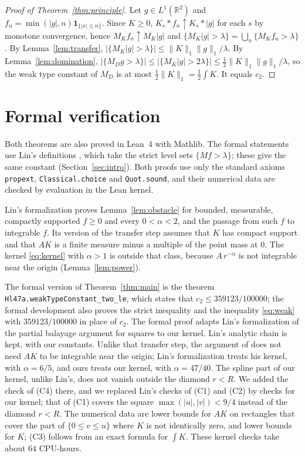 \documentclass[11pt]{amsart}
\theoremstyle{definition}
\theoremstyle{remark}
\numberwithin{equation}{section}
\newcommand{\R}{\mathbb{R}}
\newcommand{\ALPHA}{47/40}
\newcommand{\SUPPU}{9/4}
\newcommand{\LEANUPTHM}{Hl47a.\allowbreak weakType\allowbreak Constant\_\allowbreak two\_\allowbreak le}
\begin{document}
\begin{proof}[Proof of Theorem~\ref{thm:principle}]
Let $g\in L^1(\R^2)$ and $f_n=\min(|g|,n)\mathbf 1_{\{|x|\le n\}}$. Since $K\ge0$, $K_s*f_n\uparrow K_s*|g|$ for each $s$ by monotone convergence, hence $M_Kf_n\uparrow M_K|g|$ and $\{M_K|g|>\lambda\}=\bigcup_n\{M_Kf_n>\lambda\}$. By Lemma~\ref{lem:transfer}, $|\{M_K|g|>\lambda\}|\le\|K\|_1\|g\|_1/\lambda$. By Lemma~\ref{lem:domination}, $|\{M_Dg>\lambda\}|\le|\{M_K|g|>2\lambda\}|\le\frac12\|K\|_1\|g\|_1/\lambda$, so the weak type constant of $M_D$ is at most $\frac12\|K\|_1=\frac12\int K$. It equals $c_2$.
\end{proof}

\section{Formal verification}\label{app:lean}

Both theorems are also proved in Lean~4 with Mathlib. The formal statements use Lin's definitions \cite{Lin26b}, which take the strict level sets $\{Mf>\lambda\}$; these give the same constant (Section~\ref{sec:intro}). Both proofs use only the standard axioms \texttt{propext}, \texttt{Classical.choice} and \texttt{Quot.sound}, and their numerical data are checked by evaluation in the Lean kernel.

Lin's formalization \cite{Lin26b} proves Lemma~\ref{lem:obstacle} for bounded, measurable, compactly supported $f\ge0$ and every $0<\alpha<2$, and the passage from such $f$ to integrable $f$. Its version of the transfer step assumes that $K$ has compact support and that $AK$ is a finite measure minus a multiple of the point mass at $0$. The kernel \eqref{eq:kernel} with $\alpha>1$ is outside that class, because $A\,r^{-\alpha}$ is not integrable near the origin (Lemma~\ref{lem:power}).

The formal version of Theorem~\ref{thm:main} is the theorem \texttt{\LEANUPTHM}, which states that $c_2\le359123/100000$; the formal development also proves the strict inequality and the inequality \eqref{eq:weak} with $359123/100000$ in place of $c_2$. The formal proof adapts Lin's formalization of the partial balayage argument for squares \cite{Lin26d} to our kernel. Lin's analytic chain is kept, with our constants. Unlike that transfer step, the argument of \cite{Lin26d} does not need $AK$ to be integrable near the origin; Lin's formalization treats his kernel, with $\alpha=6/5$, and ours treats our kernel, with $\alpha=\ALPHA$. The spline part of our kernel, unlike Lin's, does not vanish outside the diamond $r<R$. We added the check of (C4) there, and we replaced Lin's checks of (C1) and (C2) by checks for our kernel; that of (C1) covers the square $\max(|u|,|v|)<\SUPPU$ instead of the diamond $r<R$. The numerical data are lower bounds for $AK$ on rectangles that cover the part of $\{0\le v\le u\}$ where $K$ is not identically zero, and lower bounds for $K$; (C3) follows from an exact formula for $\int K$. These kernel checks take about $64$ CPU-hours.
\end{document}
